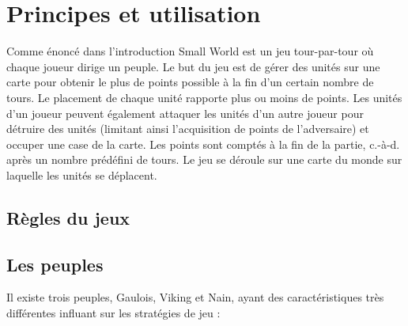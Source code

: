 \documentclass[a4paper]{article}%
\begin{document}
\section{Principes et utilisation}

Comme énoncé dans l'introduction Small World est un jeu tour-par-tour où chaque joueur dirige un peuple. Le but du jeu est de gérer des unités sur une carte pour obtenir le plus de points possible à la fin d’un certain nombre de tours. Le placement de chaque unité rapporte plus ou moins de points. Les unités d’un joueur peuvent également attaquer les unités d’un autre joueur pour détruire des unités (limitant ainsi l’acquisition de points de l’adversaire) et occuper une case de la carte. Les points sont comptés à la fin de la partie, c.-à-d. après un nombre prédéfini de tours. Le jeu se déroule sur une carte du monde sur laquelle les unités se déplacent.

\subsection{Règles du jeux}
\subsection{Les peuples}
Il existe trois peuples, Gaulois, Viking et Nain, ayant des caractéristiques très différentes influant sur les stratégies de jeu :
\end{document}
